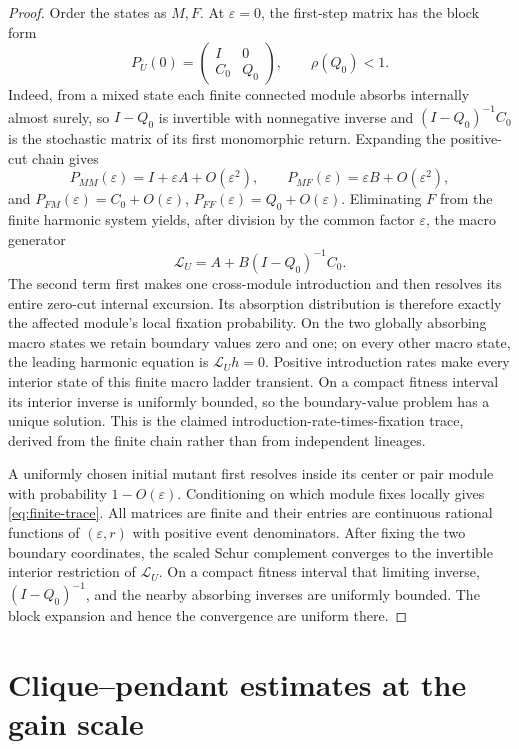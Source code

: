 \documentclass[11pt]{article}
\theoremstyle{definition}
\theoremstyle{remark}
\newcommand{\eps}{\varepsilon}
\begin{document}
\begin{proof}
Order the states as $M,F$.  At $\eps=0$, the first-step matrix
has the block form
\[
 P_U(0)=
 \begin{pmatrix}I&0\\ C_0&Q_0\end{pmatrix},
 \qquad \rho(Q_0)<1.
\]
Indeed, from a mixed state each finite connected module absorbs internally
almost surely, so $I-Q_0$ is invertible with nonnegative inverse and
$(I-Q_0)^{-1}C_0$ is the stochastic matrix of its first monomorphic return.
Expanding the positive-cut chain gives
\[
 P_{MM}(\eps)=I+\eps A+O(\eps^2),\qquad
 P_{MF}(\eps)=\eps B+O(\eps^2),
\]
and $P_{FM}(\eps)=C_0+O(\eps)$,
$P_{FF}(\eps)=Q_0+O(\eps)$.  Eliminating $F$ from the finite harmonic
system yields, after division by the common factor $\eps$, the macro
generator
\begin{equation}
 \mathcal L_U=A+B(I-Q_0)^{-1}C_0.
\label{eq:schur-trace}
\end{equation}
The second term first makes one cross-module introduction and then resolves
its entire zero-cut internal excursion.  Its absorption distribution is
therefore exactly the affected module's local fixation probability.  On the
two globally absorbing macro states we retain boundary values zero and one;
on every other macro state, the leading harmonic equation is
$\mathcal L_Uh=0$.  Positive introduction rates make every interior state
of this finite macro ladder transient.  On a compact fitness interval its
interior inverse is uniformly bounded, so the boundary-value problem has a
unique solution.  This is the claimed
introduction-rate-times-fixation trace, derived from the finite chain rather
than from independent lineages.

A uniformly chosen initial mutant first resolves inside its center or pair
module with probability $1-O(\eps)$.  Conditioning on which module fixes
locally gives \eqref{eq:finite-trace}.  All matrices are finite and their
entries are continuous rational functions of $(\eps,r)$ with positive event
denominators.  After fixing the two boundary coordinates, the scaled Schur
complement converges to the invertible interior restriction of
$\mathcal L_U$.  On a compact fitness interval that limiting inverse,
$(I-Q_0)^{-1}$, and the nearby absorbing inverses are uniformly bounded.
The block expansion and hence the convergence are uniform there.
\end{proof}

\section{Clique--pendant estimates at the gain scale}
\end{document}
